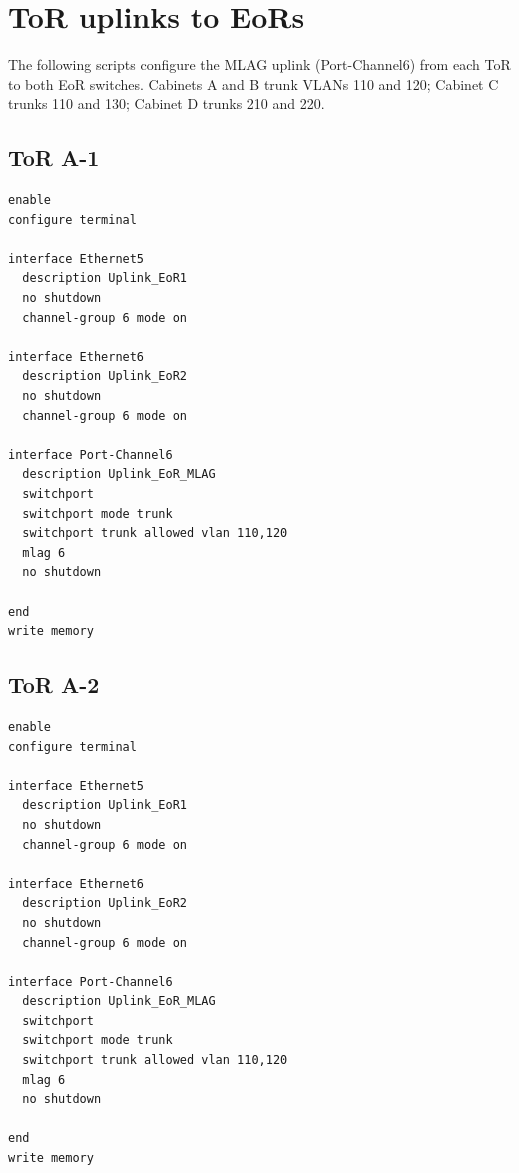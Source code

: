 \section{ToR uplinks to EoRs}

The following scripts configure the MLAG uplink (Port-Channel6) from each ToR to both EoR switches. Cabinets A and B trunk VLANs 110 and 120; Cabinet C trunks 110 and 130; Cabinet D trunks 210 and 220.

\subsection{ToR A-1}
\begin{lstlisting}[caption={ToR A-1: uplinks to EoR-1 and EoR-2.},basicstyle=\ttfamily\footnotesize,breaklines=true]
enable
configure terminal

interface Ethernet5
  description Uplink_EoR1
  no shutdown
  channel-group 6 mode on

interface Ethernet6
  description Uplink_EoR2
  no shutdown
  channel-group 6 mode on

interface Port-Channel6
  description Uplink_EoR_MLAG
  switchport
  switchport mode trunk
  switchport trunk allowed vlan 110,120
  mlag 6
  no shutdown

end
write memory
\end{lstlisting}

\subsection{ToR A-2}
\begin{lstlisting}[caption={ToR A-2: uplinks to EoR-1 and EoR-2.},basicstyle=\ttfamily\footnotesize,breaklines=true]
enable
configure terminal

interface Ethernet5
  description Uplink_EoR1
  no shutdown
  channel-group 6 mode on

interface Ethernet6
  description Uplink_EoR2
  no shutdown
  channel-group 6 mode on

interface Port-Channel6
  description Uplink_EoR_MLAG
  switchport
  switchport mode trunk
  switchport trunk allowed vlan 110,120
  mlag 6
  no shutdown

end
write memory
\end{lstlisting}


